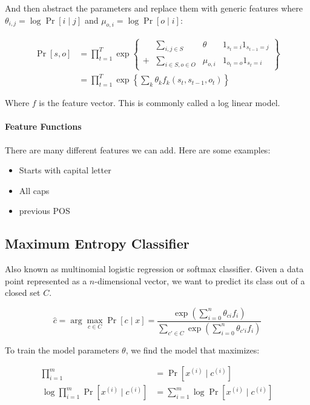\documentclass{idc_msc}
\begin{document}
And then abstract the parameters and replace them with generic features where \(\theta_{i,j} = \log\Pr[i \mid j]\) and \(\mu_{o,i} = \log \Pr[o \mid i]\):

\[
\begin{aligned}
  \Pr[s, o] &= \prod_{t=1}^T \exp \left\{\begin{matrix}
    &\sum\limits_{i,j \in S} &\theta & 1_{s_t=i} 1_{s_{t-1} = j} \\
    +& \sum\limits_{i\in S, o \in O} &\mu_{o,i} & 1_{o_t = o} 1_{s_t = i}
  \end{matrix}\right\} \\
  &= \prod_{t = 1}^T \exp\left\{\sum_{k} \theta_k f_k(s_t, s_{t-1}, o_t) \right\}
\end{aligned}
\]

Where \(f\) is the feature vector.
This is commonly called a log linear model.

\paragraph{Feature Functions}

There are many different features we can add. Here are some examples:

\begin{itemize}
  \item Starts with capital letter
  \item All caps
  \item previous POS
\end{itemize}

\subsection{Maximum Entropy Classifier}

Also known as multinomial logistic regression or softmax classifier.
Given a data point represented as a \(n\)-dimensional vector, we want to predict its class out of a closed set \(C\).

\[
  \hat{c} = \arg\max_{c \in C} \Pr[c \mid x] = \frac{\exp\left(\sum\limits_{i=0}^n \theta_{ci}f_i\right)}{\sum_{c' \in C} \exp \left(\sum\limits_{i = 0}^n \theta_{c'i} f_i\right)}
\]

To train the model parameters \(\theta\), we find the model that maximizes:

\[
\begin{aligned}
  \prod_{i = 1}^m &= \Pr[x^{(i)} \mid c^{(i)}] \\
  \log \prod_{i = 1}^m \Pr[x^{(i)} \mid c^{(i)}] &= \sum_{i=1}^m \log \Pr[x^{(i)} \mid c^{(i)}]
\end{aligned}
\]
\end{document}
